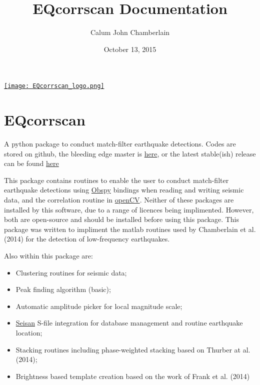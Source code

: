 \documentclass[a4paper,10pt,english]{sphinxmanual}
\title{EQcorrscan Documentation}
\date{October 13, 2015}
\author{Calum John Chamberlain}
\begin{document}
\maketitle
\tableofcontents
{}\label{index::doc}

\href{https://github.com/calum-chamberlain/EQcorrscan/releases}{\texttt{[image: EQcorrscan\_logo.png]}}

\chapter{EQcorrscan}
\label{index:eqcorrscan}\label{index:welcome-to-eqcorrscan-s-documentation}
A python package to conduct match-filter earthquake detections.  Codes are stored
on github, the bleeding edge master is \href{https://github.com/calum-chamberlain/EQcorrscan}{here}, or the latest stable(ish) release
can be found \href{https://github.com/calum-chamberlain/EQcorrscan/releases}{here}

This package contains routines to enable the user to conduct match-filter earthquake
detections using \href{https://github.com/obspy/obspy/wiki}{Obspy} bindings when reading
and writing seismic data, and the correlation routine in \href{http://opencv.org/}{openCV}.
Neither of these packages are installed by this software, due to a range of
licences being implimented.  However, both are open-source and should be installed
before using this package.  This package was written to impliment the matlab routines
used by Chamberlain et al. (2014) for the detection of low-frequency earthquakes.

Also within this package are:
\begin{itemize}
\item {} 
Clustering routines for seismic data;

\item {} 
Peak finding algorithm (basic);

\item {} 
Automatic amplitude picker for local magnitude scale;

\item {} 
\href{http://seisan.info/}{Seisan} S-file integration for database management and routine earthquake location;

\item {} 
Stacking routines including phase-weighted stacking based on Thurber at al. (2014);

\item {} 
Brightness based template creation based on the work of Frank et al. (2014)

\end{itemize}
\end{document}
